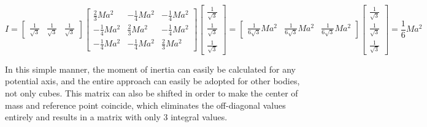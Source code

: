 \[I = \begin{bmatrix}\frac{1}{\sqrt{3}} & \frac{1}{\sqrt{3}} & \frac{1}{\sqrt{3}}\end{bmatrix}\begin{bmatrix} \frac{2}{3}Ma^2 & -\frac{1}{4}Ma^2 & -\frac{1}{4}Ma^2 \\ -\frac{1}{4}Ma^2 & \frac{2}{3}Ma^2 & -\frac{1}{4}Ma^2 \\ -\frac{1}{4}Ma^2 & -\frac{1}{4}Ma^2 & \frac{2}{3}Ma^2\end{bmatrix}\begin{bmatrix}\frac{1}{\sqrt{3}} \\ \frac{1}{\sqrt{3}} \\ \frac{1}{\sqrt{3}}\end{bmatrix} = \begin{bmatrix}\frac{1}{6\sqrt{3}}Ma^2 & \frac{1}{6\sqrt{3}}Ma^2 & \frac{1}{6\sqrt{3}}Ma^2\end{bmatrix}\begin{bmatrix}\frac{1}{\sqrt{3}} \\ \frac{1}{\sqrt{3}} \\ \frac{1}{\sqrt{3}}\end{bmatrix} = \frac{1}{6}Ma^2\] 

In this simple manner, the moment of inertia can easily be calculated for any potential axis, and the entire approach can easily be adopted for other bodies, not only cubes. This matrix can also be shifted in order to make the center of mass and reference point coincide, which eliminates the off-diagonal values entirely and results in a matrix with only 3 integral values.